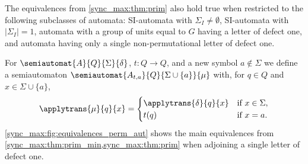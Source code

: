 The equivalences from \cref{sync_max:thm:prim}
also hold true when restricted to the following
subclasses of automata: SI-automata with $\Sigma_I \ne \emptyset$, 
SI-automata with $|\Sigma_I| = 1$, automata with a group of units equal to $G$
having a letter of defect one, and automata having only a single 
non-permutational letter of defect one.


\label{def:Afa}
For $\semiautomat{A}{Q}{\Sigma}{\delta}$,  $t \colon Q \to Q$,
and a new symbol $a \notin \Sigma$
we define a semiautomaton $\semiautomat{A_{t,a}}{Q}{\Sigma \cup \{a\}}{\mu}$
with, for $q \in Q$ and $x \in \Sigma \cup \{a\}$, \[
\applytrans{\mu}{q}{x} = \begin{cases} 
	\applytrans{\delta}{q}{x} & \text{if } x \in \Sigma, \\ 
	t(q) & \text{if } x = a.
\end{cases}
\]
\cref{sync_max:fig:equivalences_perm_aut}
shows the main equivalences from \cref{sync_max:thm:prim_min,sync_max:thm:prim}
when adjoining a single letter of defect one.



